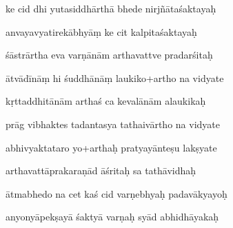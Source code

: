 \documentclass[article,12pt,a4paper]{memoir}%
\newcounter{parCount}
\begin{document}
	  
	  \pstart {} ke cid dhi yutasiddhārthā bhede nirjñātaśaktayaḥ 
	{}
	\pend%
      

	  
	  \pstart \leavevmode%
	anvayavyatirekābhyāṃ ke cit kalpitaśaktayaḥ 
	{}
	\pend%
      

	  
	  \pstart {} śāstrārtha eva varṇānām arthavattve pradarśitaḥ 
	{}
	\pend%
      

	  
	  \pstart \leavevmode%
	ātvādīnāṃ hi śuddhānāṃ laukiko+artho na vidyate 
	{}
	\pend%
      

	  
	  \pstart {} kṛttaddhitānām arthaś ca kevalānām alaukikaḥ 
	{}
	\pend%
      

	  
	  \pstart \leavevmode%
	prāg vibhaktes tadantasya tathaivārtho na vidyate 
	{}
	\pend%
      

	  
	  \pstart {} abhivyaktataro yo+arthaḥ pratyayānteṣu lakṣyate 
	{}
	\pend%
      

	  
	  \pstart \leavevmode%
	arthavattāprakaraṇād āśritaḥ sa tathāvidhaḥ 
	{}
	\pend%
      

	  
	  \pstart {} ātmabhedo na cet kaś cid varṇebhyaḥ padavākyayoḥ 
	{}
	\pend%
      

	  
	  \pstart \leavevmode%
	anyonyāpekṣayā śaktyā varṇaḥ syād abhidhāyakaḥ 
	{}
	\pend%
      
\end{document}
